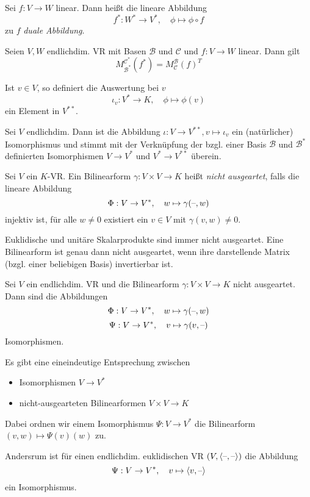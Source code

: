 \documentclass{cheat-sheet}
\newcommand{\BB}{\mathcal{B}}
\newcommand{\BC}{\mathcal{C}}
\begin{document}
\begin{defn}
  Sei $f : V \to W$ linear. Dann heißt die lineare Abbildung
  \[ f^* : W^* \to V^*, \quad \phi \mapsto \phi \circ f \]
  zu $f$ \emph{duale Abbildung}.
\end{defn}

\begin{satz}
  Seien $V, W$ endlichdim. VR mit Basen $\BB$ und $\BC$ und $f : V \to W$ linear. Dann gilt
  \[ M_{\BB^*}^{\BC^*}(f^*) = M_{\BC}^{\BB}(f)^T \]
\end{satz}

\begin{defn}
  Ist $v \in V$, so definiert die Auswertung bei $v$
  \[ \iota_v : V^* \to K, \quad \phi \mapsto \phi(v) \]
  ein Element in $V^{**}$.
\end{defn}

\begin{satz}
  Sei $V$ endlichdim. Dann ist die Abbildung $\iota : V \to V^{**}, v \mapsto \iota_v$ ein (natürlicher) Isomorphismus und stimmt mit der Verknüpfung der bzgl. einer Basis $\BB$ und $\mathcal{B^*}$ definierten Isomorphismen $V \to V^*$ und $V^* \to V^{**}$ überein.
\end{satz}

\begin{defn}
  Sei $V$ ein $K$-VR. Ein Bilinearform $\gamma : V \times V \to K$ heißt \emph{nicht ausgeartet}, falls die lineare Abbildung
  \[ \Phi : V \to V^{*}, \quad w \mapsto \gamma(\text{--}, w) \]
  injektiv ist, \dh{} für alle $w \not= 0$ existiert ein $v \in V$ mit $\gamma(v, w) \not= 0$.
\end{defn}

\begin{bem}
  Euklidische und unitäre Skalarprodukte sind immer nicht ausgeartet.
  Eine Bilinearform ist genau dann nicht ausgeartet, wenn ihre darstellende Matrix (bzgl. einer beliebigen Basis) invertierbar ist.
\end{bem}

\begin{satz}
  Sei $V$ ein endlichdim. VR und die Bilinearform $\gamma : V \times V \to K$ nicht ausgeartet. Dann sind die Abbildungen
  \[ \Phi : V \to V^*, \quad w \mapsto \gamma(\text{--}, w) \]
  \[ \Psi : V \to V^*, \quad v \mapsto \gamma(v, \text{--}) \]
  Isomorphismen.
\end{satz}

\begin{satz}
  Es gibt eine eineindeutige Entsprechung zwischen
  \begin{itemize}
    \item Isomorphismen $V \to V^*$
    \item nicht-ausgearteten Bilinearformen $V \times V \to K$
  \end{itemize}

  Dabei ordnen wir einem Isomorphismus $\Psi : V \to V^*$ die Bilinearform $(v, w) \mapsto \Psi(v)(w)$ zu.

  Andersrum ist für einen endlichdim. euklidischen VR $(V, \langle \text{--} , \text{--} \rangle)$ die Abbildung
  \[ \Psi : V \to V^*, \quad v \mapsto \langle v , \text{--} \rangle \]
  ein Isomorphismus.
\end{satz}
\end{document}
